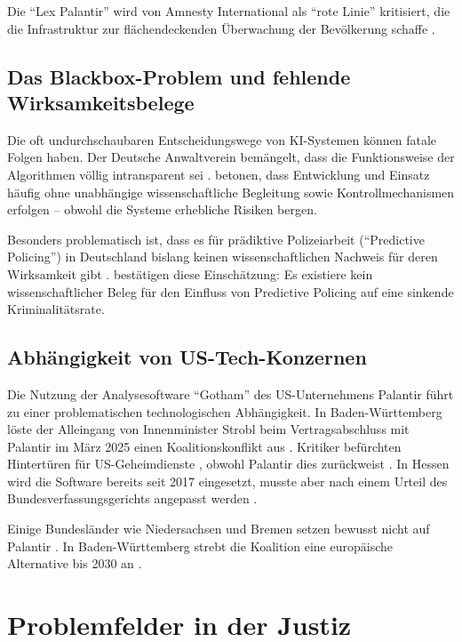 \documentclass[12pt,a4paper]{article}
\begin{document}
	Die \enquote{Lex Palantir} wird von Amnesty International als \enquote{rote Linie} kritisiert, die die Infrastruktur zur flächendeckenden Überwachung der Bevölkerung schaffe \cite{Amnesty2026}.
	
	\subsection{Das Blackbox-Problem und fehlende Wirksamkeitsbelege}
	
	Die oft undurchschaubaren Entscheidungswege von KI-Systemen können fatale Folgen haben. Der Deutsche Anwaltverein bemängelt, dass die Funktionsweise der Algorithmen völlig intransparent sei \cite{DAV2025}. \cite{Peteranderl2025} betonen, dass Entwicklung und Einsatz häufig ohne unabhängige wissenschaftliche Begleitung sowie Kontrollmechanismen erfolgen – obwohl die Systeme erhebliche Risiken bergen.
	
	Besonders problematisch ist, dass es für prädiktive Polizeiarbeit (\enquote{Predictive Policing}) in Deutschland bislang keinen wissenschaftlichen Nachweis für deren Wirksamkeit gibt \cite{Peteranderl2025}. \cite{CILIP2025} bestätigen diese Einschätzung: Es existiere kein wissenschaftlicher Beleg für den Einfluss von Predictive Policing auf eine sinkende Kriminalitätsrate.
	
	\subsection{Abhängigkeit von US-Tech-Konzernen}
	
	Die Nutzung der Analysesoftware \enquote{Gotham} des US-Unternehmens Palantir führt zu einer problematischen technologischen Abhängigkeit. In Baden-Württemberg löste der Alleingang von Innenminister Strobl beim Vertragsabschluss mit Palantir im März 2025 einen Koalitionskonflikt aus \cite{FR2026}. Kritiker befürchten Hintertüren für US-Geheimdienste \cite{Focus2025}, obwohl Palantir dies zurückweist \cite{Spiegel2025}. In Hessen wird die Software bereits seit 2017 eingesetzt, musste aber nach einem Urteil des Bundesverfassungsgerichts angepasst werden \cite{FR2026}.
	
	Einige Bundesländer wie Niedersachsen und Bremen setzen bewusst nicht auf Palantir \cite{Goslarsche2025}. In Baden-Württemberg strebt die Koalition eine europäische Alternative bis 2030 an \cite{FR2026}.
	
	\section{Problemfelder in der Justiz}
	
\end{document}
